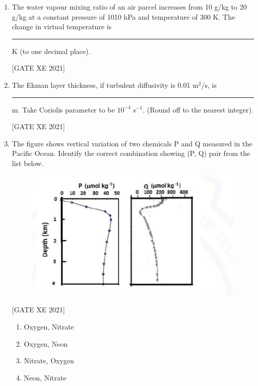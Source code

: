 \documentclass[journal,12pt,onecolumn]{IEEEtran}
\theoremstyle{remark}
\begin{document}
\begin{enumerate}[resume]
\begin{multicols}{2}
\begin{enumerate}
\item Isobaric process
\item Isothermal process
\item Adiabatic process
\item Isentropic process
\end{enumerate}
\end{multicols}

\item The water vapour mixing ratio of an air parcel increases from 10 g/kg to 20 g/kg at a constant pressure of 1010 hPa and temperature of 300 K. The change in virtual temperature is \rule{3cm}{0.15mm} K (to one decimal place).

\hfill[GATE XE 2021]


\item The Ekman layer thickness, if turbulent diffusivity is 0.01 m$^2$/s, is \rule{3cm}{0.15mm} m. Take Coriolis parameter to be $10^{-4}$ s$^{-1}$. (Round off to the nearest integer).

\hfill[GATE XE 2021]


\item The figure shows vertical variation of two chemicals P and Q measured in the Pacific Ocean. Identify the correct combination showing (P, Q) pair from the list below.

\begin{figure}[H]
      \centering
      \includegraphics[width=0.5\columnwidth]{figs/fig35.png}
      \caption{}
      \label{fig:placeholder}
  \end{figure}

\hfill[GATE XE 2021]

\begin{multicols}{2}
\begin{enumerate}
\item Oxygen, Nitrate
\item Oxygen, Neon
\item Nitrate, Oxygen
\item Neon, Nitrate
\end{enumerate}
\end{multicols}



\end{enumerate}
\end{document}
